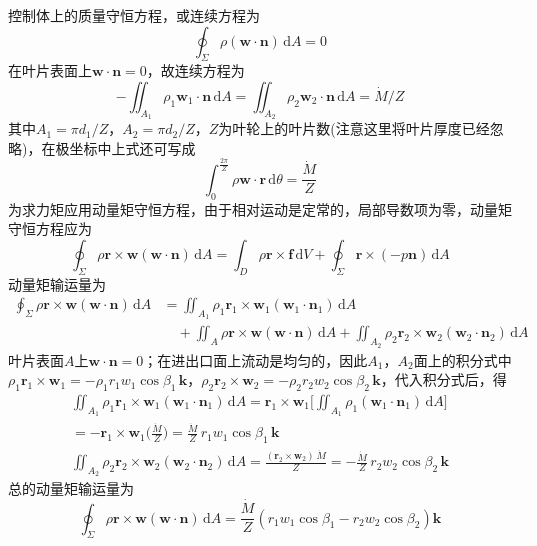 控制体上的质量守恒方程，或连续方程为
\[
\oint_\Sigma \rho(\boldsymbol{w}\cdot\boldsymbol{n})\,\mathrm{d}A=0
\]
在叶片表面上$\boldsymbol{w}\cdot\boldsymbol{n}=0$，故连续方程为
\[
-\iint_{A_1}\rho_1\boldsymbol{w}_1\cdot\boldsymbol{n}\,\mathrm{d}A=\iint_{A_2}\rho_2\boldsymbol{w}_2\cdot\boldsymbol{n}\,\mathrm{d}A=\dot{M}/Z
\]
其中$A_1=\pi d_1/Z$，$A_2=\pi d_2/Z$，$Z$为叶轮上的叶片数(注意这里将叶片厚度已经忽略)，在极坐标中上式还可写成
\[
\int_0^{\frac{2\pi}{Z}} \rho\boldsymbol{w}\cdot\boldsymbol{r}\,\mathrm{d}\theta=\frac{\dot{M}}{Z}
\]
为求力矩应用动量矩守恒方程，由于相对运动是定常的，局部导数项为零，动量矩守恒方程应为
\[
\oint_\Sigma \rho\boldsymbol{r}\times\boldsymbol{w}(\boldsymbol{w}\cdot\boldsymbol{n})\,\mathrm{d}A=\int_D \rho\boldsymbol{r}\times\boldsymbol{f}\,\mathrm{d}V+\oint_\Sigma \boldsymbol{r}\times(-p\boldsymbol{n})\,\mathrm{d}A
\]
动量矩输运量为
\begin{align*}
\oint_\Sigma \rho\boldsymbol{r}\times\boldsymbol{w}(\boldsymbol{w}\cdot\boldsymbol{n})\,\mathrm{d}A&=\iint_{A_1}\rho_1\boldsymbol{r}_1\times\boldsymbol{w}_1(\boldsymbol{w}_1\cdot\boldsymbol{n}_1)\,\mathrm{d}A\\
&\quad+\iint_{A}\rho\boldsymbol{r}\times\boldsymbol{w}(\boldsymbol{w}\cdot\boldsymbol{n})\,\mathrm{d}A+\iint_{A_2}\rho_2\boldsymbol{r}_2\times\boldsymbol{w}_2(\boldsymbol{w}_2\cdot\boldsymbol{n}_2)\,\mathrm{d}A
\end{align*}
叶片表面$A$上$\boldsymbol{w}\cdot\boldsymbol{n}=0$；在进出口面上流动是均匀的，因此$A_1$，$A_2$面上的积分式中$\rho_1\boldsymbol{r}_1\times\boldsymbol{w}_1=-\rho_1r_1w_1\cos\beta_1\,\boldsymbol{k}$，$\rho_2\boldsymbol{r}_2\times\boldsymbol{w}_2=-\rho_2r_2w_2\cos\beta_2\,\boldsymbol{k}$，代入积分式后，得
\begin{gather*}
\iint_{A_1}\rho_1\boldsymbol{r}_1\times\boldsymbol{w}_1(\boldsymbol{w}_1\cdot\boldsymbol{n}_1)\,\mathrm{d}A=\boldsymbol{r}_1\times\boldsymbol{w}_1\bigg[\iint_{A_1}\rho_1(\boldsymbol{w}_1\cdot\boldsymbol{n}_1)\,\mathrm{d}A\bigg]\\[4pt]
=-\boldsymbol{r}_1\times\boldsymbol{w}_1\Big(\frac{\dot{M}}{Z}\Big)=\frac{\dot{M}}{Z}\,r_1w_1\cos\beta_1\,\boldsymbol{k}\\[4pt]
\iint_{A_2}\rho_2\boldsymbol{r}_2\times\boldsymbol{w}_2(\boldsymbol{w}_2\cdot\boldsymbol{n}_2)\,\mathrm{d}A=\frac{(\boldsymbol{r}_2\times\boldsymbol{w}_2)\,\dot{M}}{Z}=-\frac{\dot{M}}{Z}\,r_2w_2\cos\beta_2\,\boldsymbol{k}
\end{gather*}
总的动量矩输运量为
\[
\oint_\Sigma \rho\boldsymbol{r}\times\boldsymbol{w}(\boldsymbol{w}\cdot\boldsymbol{n})\,\mathrm{d}A=\frac{\dot{M}}{Z}(r_1w_1\cos\beta_1-r_2w_2\cos\beta_2)\boldsymbol{k}
\]
